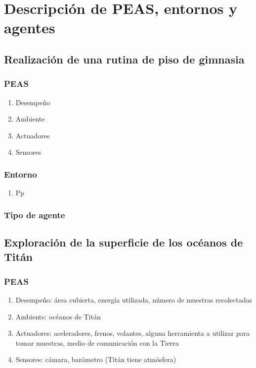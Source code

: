 \documentclass{article}
\begin{document}
    \section{Descripción de PEAS, entornos y agentes}

        \subsection{Realización de una rutina de piso de gimnasia}
            \subsubsection{PEAS}
                \begin{enumerate}
                    \item Desempeño
                    \item Ambiente
                    \item Actuadores
                    \item Sensores
                \end{enumerate}

            \subsubsection{Entorno}
                \begin{enumerate}
                    \item Pp
                \end{enumerate}
            \subsubsection{Tipo de agente}
                
        \subsection{Exploración de la superficie de los océanos de Titán}

            \subsubsection{PEAS}
                \begin{enumerate}
                    \item Desempeño: área cubierta, energía utilizada, número de muestras recolectadas
                    \item Ambiente: océanos de Titán
                    \item Actuadores: aceleradores, frenos, volantes, alguna herramienta a utilizar para tomar muestras, medio de comunicación con la Tierra
                    \item Sensores: cámara, barómetro (Titán tiene atmósfera)
            \end{enumerate}
\end{document}
